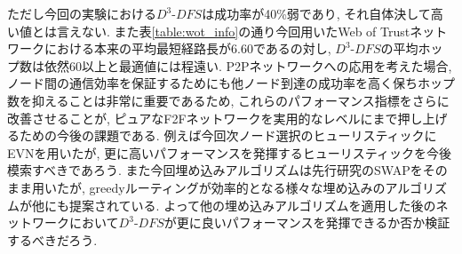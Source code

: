 \documentclass[technicalreport]{./ieicej-v3.0/UTF/ieicej}
\begin{document}
ただし今回の実験における$D^3$-$DFS$は成功率が40\%弱であり, それ自体決して高い値とは言えない. また表\ref{table:wot_info}の通り今回用いたWeb of Trustネットワークにおける本来の平均最短経路長が6.60であるの対し, $D^3$-$DFS$の平均ホップ数は依然60以上と最適値には程遠い. P2Pネットワークへの応用を考えた場合, ノード間の通信効率を保証するためにも他ノード到達の成功率を高く保ちホップ数を抑えることは非常に重要であるため, これらのパフォーマンス指標をさらに改善させることが, ピュアなF2Fネットワークを実用的なレベルにまで押し上げるための今後の課題である. 例えば今回次ノード選択のヒューリスティックにEVNを用いたが, 更に高いパフォーマンスを発揮するヒューリスティックを今後模索すべきであろう. また今回埋め込みアルゴリズムは先行研究のSWAPをそのまま用いたが, greedyルーティングが効率的となる様々な埋め込みのアルゴリズムが他にも提案されている. よって他の埋め込みアルゴリズムを適用した後のネットワークにおいて$D^3$-$DFS$が更に良いパフォーマンスを発揮できるか否か検証するべきだろう.


\end{document}
